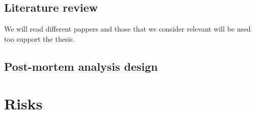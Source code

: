 \documentclass[10pt,a4paper]{proposal}
\begin{document}
	\subsection{Literature review}
		We will read different pappers and those that we consider relevant will be used too support the thesis.

	\subsection{Post-mortem analysis design}


\section*{Risks}

\footnotesize


 
 
\end{document}
